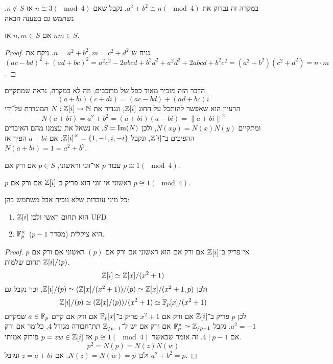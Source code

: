 במקרה זה נבדוק את $a^2 + b^2 \cong n (\mod 4)$, נקבל שאם $n \cong 3 (\mod 4)$ אז $n \notin S$.
נשתמש גם בטענה הבאה
\begin{proposition}
	אם $n, m \in S$ אז $nm \in S$.
\end{proposition}
\begin{proof}
	נניח ש־$n = a^2 + b^2, m = c^2 + d^2$.
	ניקח את ${(ac - bd)}^2 + {(ad + bc)}^2 = a^2 c^2 - 2abcd + b^2 d^2 + a^2 d^2 + 2abcd + b^2 c^2 = (a^2 + b^2)(c^2 + d^2) = n \cdot m$.
\end{proof}
הדבר הזה מזכיר מאוד כפל של מרוכבים, וזה לא במקרה, נראה שמתקיים
\[
	(a + bi)(c + di) = (ac - bd) + (ad + bc)i
\]
הרעיון הוא שאפשר להזתכל על החוג $\mathbb{Z}[i]$, ונגדיר את $N : \mathbb{Z}[i] \to \mathbb{N}$ המוגדרת על־ידי
\[
	N(a + bi) = a^2 + b^2 = (a + bi)(a - bi) = {\lVert a + bi \rVert}^2
\]
ומתקיים $N(xy) = N(x)N(y)$, ולכן $S = \operatorname{Im}(N)$.
אז נשאל את עצמנו מהם האיברים ההפיכים ב־$\mathbb{Z}[i]$, ונקבל ${\mathbb{Z}[i]}^\times = \{ 1, -1, i, -i \}$.
אם $a + bi$ הפיך אז $N(a + bi) = 1 = a^2 + b^2$.
\begin{proposition}
	עבור $p$ אי־זוגי וראשוני, $p \in S$ אם ורק אם $p \cong 1 (\mod 4)$.
\end{proposition}
\begin{lemma}
	$p$ ראשוני אי־זוגי הוא פריק ב־$\mathbb{Z}[i]$ אם ורק אם $p \cong 1 (\mod 4)$.
\end{lemma}
כל מיני עובדות שלא נוכיח אבל משתמש בהן:
\begin{enumerate}
	\item $\mathbb{Z}[i]$ הוא תחום ראשי ולכן UFD
	\item $\mathbb{F}_p^\times$ היא ציקלית (מסדר $p - 1$).
\end{enumerate}
\begin{proof}
	$p$ אי־פריק ב־$\mathbb{Z}[i]$ אם ורק אם הוא ראשוני אם ורק אם $(p)$ ראשוני אם ורק אם $\mathbb{Z}[i] / (p)$ תחום שלמות.
	\[
		\mathbb{Z}[i] \simeq \mathbb{Z}[x] / (x^2 + 1)
	\]
	ולכן $\mathbb{Z}[i] / (p) \simeq (\mathbb{Z}[x] / (x^2 + 1)) / (p) \simeq \mathbb{Z}[x] / (x^2 + 1, p)$, וכך נקבל גם
	\[
		\mathbb{Z}[i] / (p) \simeq (\mathbb{Z}[x] / (p)) / (x^2 + 1) \simeq \mathbb{F}_p[x] / (x^2 + 1)
	\]
	לכן $p$ פריק ב־$\mathbb{Z}[i]$ אם ורק אם $x^2 + 1$ פריק ב־$\mathbb{F}_p[x]$ אם ורק אם קיים $a \in \mathbb{F}_p$ שמקיים $a^2 = -1$.
	נקבל $\mathbb{F}_p^\times \simeq \mathbb{Z}_{/p - 1}$ אם ורק אם יש ל־$\mathbb{Z}_{/p - 1}$ תת־חבורה מגודל 4, כלומר אם ורק אם $4 \mid p - 1$.
	זה אומר שכאשר $p \cong 1 (\mod 4)$ אז $p = zw \in \mathbb{Z}[i]$ פירוק אמיתי.
	\[
		p^2 = N(p) = N(z) N(w)
	\]
	ולכן $N(z) = N(w) = p$.
	אם $z = a + bi$ ונקבל $a^2 + b^2 = p$.
\end{proof}


